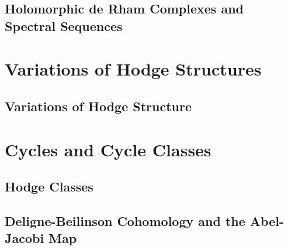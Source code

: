 \documentclass[oneside]{amsbook}
\begin{document}
\chapter{Holomorphic de Rham Complexes and Spectral Sequences}


\part{Variations of Hodge Structures}
\setcounter{chapter}{9}
\chapter{Variations of Hodge Structure}


\part{Cycles and Cycle Classes}
\chapter{Hodge Classes}


\chapter{Deligne-Beilinson Cohomology and the Abel-Jacobi Map}

\end{document}
